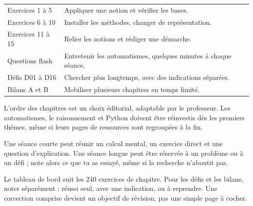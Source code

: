 \thispagestyle{otFront}
\begin{tabularx}{\linewidth}{@{}lY@{}}\toprule
Exercices 1 à 5 & Appliquer une notion et vérifier les bases.\\[2mm]
Exercices 6 à 10 & Installer les méthodes, changer de représentation.\\[2mm]
Exercices 11 à 15 & Relier les notions et rédiger une démarche.\\[2mm]
Questions flash & Entretenir les automatismes, quelques minutes à chaque séance.\\[2mm]
Défis D01 à D16 & Chercher plus longtemps, avec des indications séparées.\\[2mm]
Bilans A et B & Mobiliser plusieurs chapitres en temps limité.\\\bottomrule
\end{tabularx}\par\bigskip
{}
\par\medskip{}
L’ordre des chapitres est un choix éditorial, adaptable par le professeur. Les automatismes, le raisonnement et Python doivent être réinvestis dès les premiers thèmes, même si leurs pages de ressources sont regroupées à la fin.\par\medskip
Une séance courte peut réunir un calcul mental, un exercice direct et une question d’explication. Une séance longue peut être réservée à un problème ou à un défi ; note alors ce que tu as essayé, même si la recherche n’aboutit pas.\par\medskip
\begin{savoirfaire}Le tableau de bord suit les 240 exercices de chapitre. Pour les défis et les bilans, noter séparément : réussi seul, avec une indication, ou à reprendre. Une correction comprise devient un objectif de révision, pas une simple page à cocher.\end{savoirfaire}
\clearpage